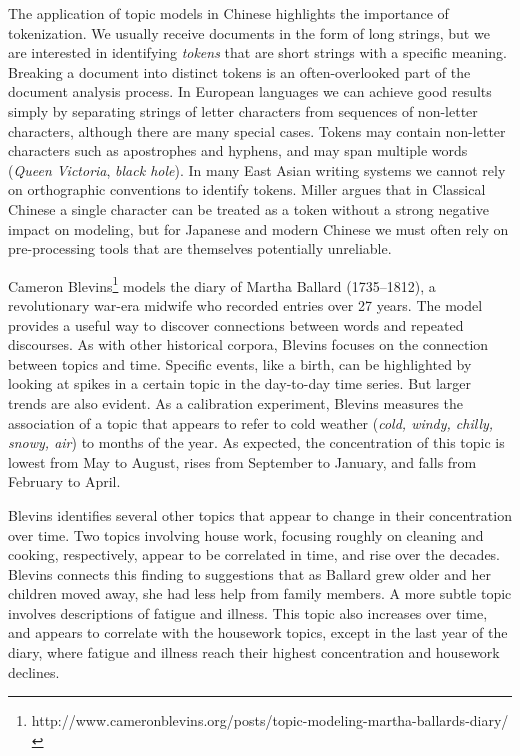 The application of topic models in Chinese highlights the importance of tokenization.
We usually receive documents in the form of long strings, but we are interested in identifying {\em tokens} that are short strings with a specific meaning.
Breaking a document into distinct tokens is an often-overlooked part of the document analysis process.
In European languages we can achieve good results simply by separating strings of letter characters from sequences of non-letter characters, although there are many special cases.
Tokens may contain non-letter characters such as apostrophes and hyphens, and may span multiple words ({\em Queen Victoria}, {\em black hole}).
In many East Asian writing systems we cannot rely on orthographic conventions to identify tokens.
Miller argues that in Classical Chinese a single character can be treated as a token without a strong negative impact on modeling, but for Japanese and modern Chinese we must often rely on pre-processing tools that are themselves potentially unreliable.


Cameron Blevins\footnote{http://www.cameronblevins.org/posts/topic-modeling-martha-ballards-diary/} models the diary of Martha Ballard (1735--1812), a revolutionary war-era midwife who recorded entries over 27 years. The model provides a useful way to discover connections between words and repeated discourses.
As with other historical corpora, Blevins focuses on the connection between topics and time.
Specific events, like a birth, can be highlighted by looking at spikes in a certain topic in the day-to-day time series.
But larger trends are also evident.
As a calibration experiment, Blevins measures the association of a topic that appears to refer to cold weather ({\em cold, windy, chilly, snowy, air}) to months of the year.
As expected, the concentration of this topic is lowest from May to August, rises from September to January, and falls from February to April.

Blevins identifies several other topics that appear to change in their concentration over time.
Two topics involving house work, focusing roughly on cleaning and cooking, respectively, appear to be correlated in time, and rise over the decades.
Blevins connects this finding to suggestions that as Ballard grew older and her children moved away, she had less help from family members.
A more subtle topic involves descriptions of fatigue and illness.
This topic also increases over time, and appears to correlate with the housework topics, except in the last year of the diary, where fatigue and illness reach their highest concentration and housework declines.

